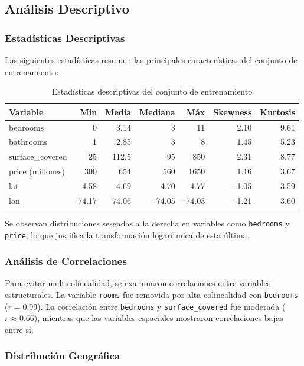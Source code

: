 \documentclass[12pt,a4paper,onecolumn]{article}
\begin{document}
\subsection{Análisis Descriptivo}

\subsubsection{Estadísticas Descriptivas}

Las siguientes estadísticas resumen las principales características del conjunto de entrenamiento:

\begin{table}[H]
\centering
\begin{tabular}{lrrrrrr}
\toprule
Variable & Min & Media & Mediana & Máx & Skewness & Kurtosis \\
\midrule
bedrooms & 0 & 3.14 & 3 & 11 & 2.10 & 9.61 \\
bathrooms & 1 & 2.85 & 3 & 8 & 1.45 & 5.23 \\
surface\_covered & 25 & 112.5 & 95 & 850 & 2.31 & 8.77 \\
price (millones) & 300 & 654 & 560 & 1650 & 1.16 & 3.67 \\
lat & 4.58 & 4.69 & 4.70 & 4.77 & -1.05 & 3.59 \\
lon & -74.17 & -74.06 & -74.05 & -74.03 & -1.21 & 3.60 \\
\bottomrule
\end{tabular}
\caption{Estadísticas descriptivas del conjunto de entrenamiento}
\end{table}

Se observan distribuciones sesgadas a la derecha en variables como \texttt{bedrooms} y \texttt{price}, lo que justifica la transformación logarítmica de esta última.

\subsubsection{Análisis de Correlaciones}

Para evitar multicolinealidad, se examinaron correlaciones entre variables estructurales. La variable \texttt{rooms} fue removida por alta colinealidad con \texttt{bedrooms} ($r = 0.99$). La correlación entre \texttt{bedrooms} y \texttt{surface\_covered} fue moderada ($r \approx 0.66$), mientras que las variables espaciales mostraron correlaciones bajas entre sí.

\subsubsection{Distribución Geográfica}
\end{document}
